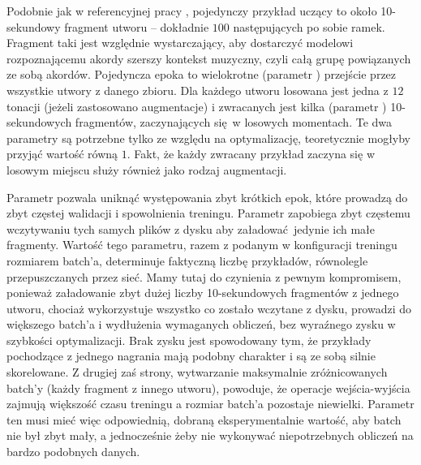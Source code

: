 Podobnie jak w referencyjnej pracy \cite{park_bi-directional_2019}, pojedynczy przykład uczący to
około 10-sekundowy fragment utworu -- dokładnie $100$ następujących po sobie ramek. Fragment taki
jest względnie wystarczający, aby dostarczyć modelowi rozpoznającemu akordy szerszy kontekst
muzyczny, czyli całą grupę powiązanych ze sobą akordów. Pojedyncza epoka to wielokrotne (parametr
) przejście przez wszystkie utwory z danego zbioru. Dla
każdego utworu losowana jest jedna z $12$ tonacji (jeżeli zastosowano augmentacje) i zwracanych jest
kilka (parametr ) 10-sekundowych fragmentów, zaczynających się w losowych
momentach. Te dwa parametry są potrzebne tylko ze względu na optymalizację, teoretycznie mogłyby przyjąć
wartość równą $1$. Fakt, że każdy zwracany przykład zaczyna się w losowym miejscu służy również jako
rodzaj augmentacji.

Parametr  pozwala uniknąć występowania zbyt krótkich epok, które prowadzą do
zbyt częstej walidacji i spowolnienia treningu. Parametr  zapobiega zbyt
częstemu wczytywaniu tych samych plików z dysku aby załadować jedynie ich małe fragmenty. Wartość
tego parametru, razem z podanym w konfiguracji treningu rozmiarem batch'a, determinuje faktyczną
liczbę przykładów, równolegle przepuszczanych przez sieć. Mamy tutaj do czynienia z pewnym
kompromisem, ponieważ załadowanie zbyt dużej liczby 10-sekundowych fragmentów z jednego utworu,
chociaż wykorzystuje wszystko co zostało wczytane z dysku, prowadzi do większego batch'a i
wydłużenia wymaganych obliczeń, bez wyraźnego zysku w szybkości optymalizacji. Brak zysku jest
spowodowany tym, że przykłady pochodzące z jednego nagrania mają podobny charakter i są ze sobą
silnie skorelowane. Z drugiej zaś strony, wytwarzanie maksymalnie zróżnicowanych batch'y (każdy
fragment z innego utworu), powoduje, że operacje wejścia-wyjścia zajmują większość czasu treningu a
rozmiar batch'a pozostaje niewielki.  Parametr ten musi mieć więc odpowiednią, dobraną
eksperymentalnie wartość, aby batch nie był zbyt mały, a jednocześnie żeby nie wykonywać
niepotrzebnych obliczeń na bardzo podobnych danych.

